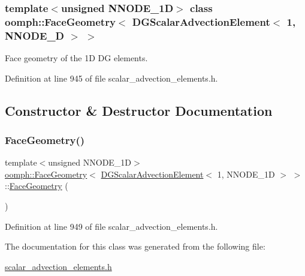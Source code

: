 \subsubsection*{template$<$unsigned N\+N\+O\+D\+E\+\_\+1D$>$\newline
class oomph\+::\+Face\+Geometry$<$ D\+G\+Scalar\+Advection\+Element$<$ 1, N\+N\+O\+D\+E\+\_\+D $>$ $>$}

Face geometry of the 1D DG elements. 

Definition at line 945 of file scalar\+\_\+advection\+\_\+elements.\+h.



\subsection{Constructor \& Destructor Documentation}
\mbox{\label{classoomph_1_1FaceGeometry_3_01DGScalarAdvectionElement_3_011_00_01NNODE__1D_01_4_01_4_a86c590cecb530375474dbc5c8a597c48}} 
\subsubsection{\texorpdfstring{Face\+Geometry()}{FaceGeometry()}}
{\footnotesize\ttfamily template$<$unsigned N\+N\+O\+D\+E\+\_\+1D$>$ \\
\hyperlink{classoomph_1_1FaceGeometry}{oomph\+::\+Face\+Geometry}$<$ \hyperlink{classoomph_1_1DGScalarAdvectionElement}{D\+G\+Scalar\+Advection\+Element}$<$ 1, N\+N\+O\+D\+E\+\_\+1D $>$ $>$\+::\hyperlink{classoomph_1_1FaceGeometry}{Face\+Geometry} (\begin{DoxyParamCaption}{ }\end{DoxyParamCaption})\hspace{0.3cm}{\ttfamily [inline]}}



Definition at line 949 of file scalar\+\_\+advection\+\_\+elements.\+h.



The documentation for this class was generated from the following file\+:\begin{DoxyCompactItemize}
\item 
\hyperlink{scalar__advection__elements_8h}{scalar\+\_\+advection\+\_\+elements.\+h}\end{DoxyCompactItemize}
